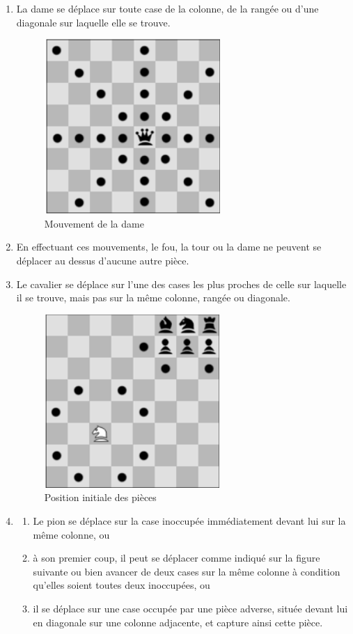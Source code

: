 \begin{enumerate}
\item La dame se déplace sur toute case de la colonne, de la rangée ou d’une diagonale sur laquelle elle se trouve.

\begin{figure}[H]
  \centering
  \includegraphics[scale=0.5]{reine.png}
  \caption{Mouvement de la dame}
\end{figure}

\item En effectuant ces mouvements, le fou, la tour ou la dame ne peuvent se déplacer au dessus d’aucune autre pièce.

\item Le cavalier se déplace sur l’une des cases les plus proches de celle sur laquelle il se trouve, mais pas sur la même colonne, rangée ou diagonale.

\begin{figure}[H]
  \centering
  \includegraphics[scale=0.5]{cheval.png}
  \caption{Position initiale des pièces}
\end{figure}

\item 
    \begin{enumerate}
        \item Le pion se déplace sur la case inoccupée immédiatement devant lui sur la même colonne, ou
        \item à son premier coup, il peut se déplacer comme indiqué sur la figure suivante ou bien avancer de deux cases sur la même
        colonne à condition qu’elles soient toutes deux inoccupées, ou
        \item il se déplace sur une case occupée par une pièce adverse, située devant lui en diagonale sur une
        colonne adjacente, et capture ainsi cette pièce.


\end{enumerate}
\end{enumerate}
